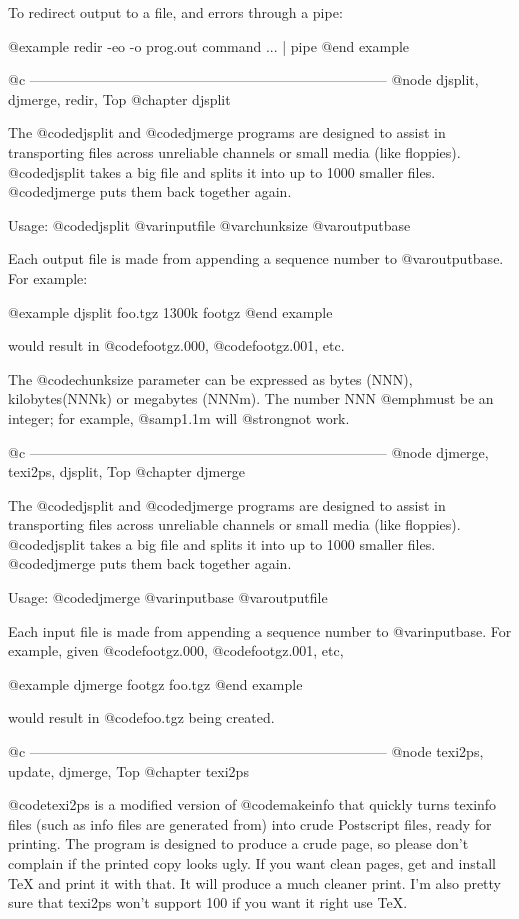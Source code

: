 To redirect output to a file, and errors through a pipe:

@example
redir -eo -o prog.out command ... | pipe
@end example

@c -----------------------------------------------------------------------------
@node djsplit, djmerge, redir, Top
@chapter djsplit

The @code{djsplit} and @code{djmerge} programs are designed to assist in
transporting files across unreliable channels or small media (like
floppies).  @code{djsplit} takes a big file and splits it into up to 1000
smaller files.  @code{djmerge} puts them back together again.

Usage: @code{djsplit} @var{inputfile} @var{chunksize} @var{outputbase}

Each output file is made from appending a sequence number to
@var{outputbase}.  For example:

@example
djsplit foo.tgz 1300k footgz
@end example

would result in @code{footgz.000}, @code{footgz.001}, etc.

The @code{chunksize} parameter can be expressed as bytes (NNN),
kilobytes(NNNk) or megabytes (NNNm).  The number NNN @emph{must} be an
integer; for example, @samp{1.1m} will @strong{not} work.

@c -----------------------------------------------------------------------------
@node djmerge, texi2ps, djsplit, Top
@chapter djmerge

The @code{djsplit} and @code{djmerge} programs are designed to assist in
transporting files across unreliable channels or small media (like
floppies).  @code{djsplit} takes a big file and splits it into up to 1000
smaller files.  @code{djmerge} puts them back together again.

Usage: @code{djmerge} @var{inputbase} @var{outputfile}

Each input file is made from appending a sequence number to
@var{inputbase}.  For example, given @code{footgz.000},
@code{footgz.001}, etc,

@example
djmerge footgz foo.tgz
@end example

would result in @code{foo.tgz} being created.

@c -----------------------------------------------------------------------------
@node texi2ps, update, djmerge, Top
@chapter texi2ps

@code{texi2ps} is a modified version of @code{makeinfo} that quickly turns
texinfo files (such as info files are generated from) into crude
Postscript files, ready for printing.  The program is designed to
produce a crude page, so please don't complain if the printed copy looks
ugly.  If you want clean pages, get and install TeX and print it with
that.  It will produce a much cleaner print.  I'm also pretty sure that
texi2ps won't support 100%
if you want it right use TeX.

